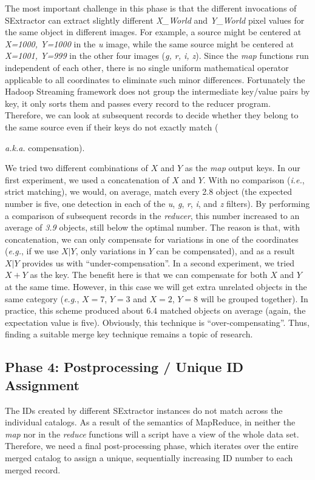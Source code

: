\documentclass[11pt,twoside]{article}
\begin{document}
The most important challenge in this phase is that the different invocations of SExtractor can extract slightly different \textit{X\_World} and \textit{Y\_World} pixel values for the same object in different images. For example, a source might be centered at \textit{X=1000, Y=1000} in the \textit{u} image, while the same source might be centered at \textit{X=1001, Y=999} in the other four images (\textit{g, r, i, z}). Since the \textit{map} functions run independent of each other, there is no single uniform mathematical operator applicable to all coordinates to eliminate such minor differences.
Fortunately the Hadoop Streaming framework does not group the intermediate key/value pairs by key, it only sorts them and passes every record to the reducer program. Therefore, we can look at subsequent records to decide whether they belong to the same source even if their keys do not exactly match ({\textit{a.k.a.} compensation).  

We tried two different combinations of $X$ and $Y$ as the \textit{map} output keys. In our first experiment, we used a concatenation of $X$ and $Y$. With no comparison (\textit{i.e.}, strict matching), we would, on average, match every 2.8 object (the expected number is five, one detection in each of the \textit{u}, \textit{g}, \textit{r}, \textit{i}, and \textit{z} filters). By performing a comparison of subsequent records in the \textit{reducer}, this number increased to an average of \textit{3.9} objects, still below the optimal number. The reason is that, with concatenation, we can only compensate for variations in one of the coordinates (\textit{e.g.}, if we use $X|Y$, only variations in $Y$ can be compensated), and as a result $X|Y$ provides us with ``under-compensation''.
In a second experiment, we tried $X+Y$ as the key. The benefit here is that we can compensate for both $X$ and $Y$ at the same time. However, in this case we will get extra unrelated objects in the same category (\textit{e.g.}, $X=7$, $Y=3$ and $X=2$, $Y=8$ will be grouped together). In practice, this scheme produced about 6.4 matched objects on average (again, the expectation value is five). Obviously, this technique is ``over-compensating''. Thus, finding a suitable merge key technique remains a topic of research.

\subsection{Phase 4: Postprocessing / Unique ID Assignment} 
The IDs created by different SExtractor instances do not match across the individual catalogs. As a result of the semantics of MapReduce, in neither the \textit{map} nor in the \textit{reduce} functions will a script have a view of the whole data set. Therefore, we need a final post-processing phase, which iterates over the entire merged catalog to assign a unique, sequentially increasing ID number to each merged record.

}
\end{document}
